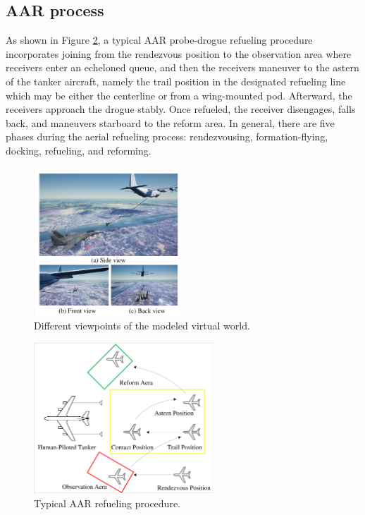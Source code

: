 \subsection{ AAR process}\label{sec4.1}
As shown in Figure \ref{FIG_11}, a typical AAR probe-drogue refueling procedure incorporates joining from the rendezvous position to the observation area where receivers enter an echeloned queue, and then the receivers maneuver to the astern of the tanker aircraft, namely the trail position in the designated refueling line which may be either the centerline or from a wing-mounted pod. Afterward, the receivers approach the drogue stably. Once refueled, the receiver disengages, falls back, and maneuvers starboard to the reform area. In general, there are five phases during the aerial refueling process: rendezvousing, formation-flying, docking, refueling, and reforming.

\begin{figure}[th]
	\centering
	\includegraphics[width=0.5\textwidth]{Figures/Figs_Ch5/Fig10.pdf}
	\caption{Different viewpoints of the modeled virtual world.}\label{FIG_10}
\end{figure}

\begin{figure}[th]
	\centering
	\includegraphics[width=0.6\textwidth]{Figures/Figs_Ch5/Fig11.pdf}
	\caption{Typical AAR refueling procedure.}\label{FIG_11}
\end{figure}

